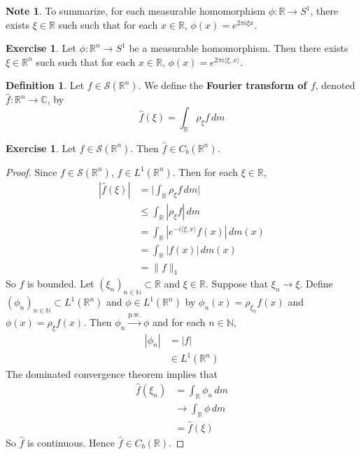 \documentclass{book}
\theoremstyle{definition}
\newtheorem{defn}[definition]{Definition}
\newtheorem{note}[definition]{Note}
\newtheorem{ex}[definition]{Exercise}
\newcommand{\C}{\mathbb{C}}
\newcommand{\N}{\mathbb{N}}
\newcommand{\R}{\mathbb{R}}
\newcommand{\MS}{\mathcal{S}}
\DeclareMathOperator*{\0}{\mbf{0}}
\DeclareMathOperator*{\1}{\mbf{1}}
\renewcommand{\r}{\rangle}
\renewcommand{\l}{\langle}
\newcommand{\convt}[1]{\xrightarrow{\text{#1}}}
\newcommand{\dm}{\, d m}
\begin{document}
	\begin{note}
		To summarize, for each measurable homomorphism $\phi:\R \rightarrow S^1$, there exists $\xi \in \R$ such  such that for each $x \in \R$, $\phi(x) = e^{2 \pi i  \xi x}$. 
	\end{note}

	\begin{ex}
		Let $\phi:\R^n \rightarrow S^1$ be a measurable homomorphism. Then there exists $\xi \in \R^n$ such such that for each $x \in \R$, $\phi(x) = e^{2 \pi i \l \xi,  x \r}$. 
	\end{ex}
	
	\begin{defn}
		Let $f \in \MS(\R^n)$. We define the \textbf{Fourier transform of $f$}, denoted $\hat{f} : \R^n \rightarrow \C$, by $$ \hat{f}(\xi) = \int_{\R} \rho_{\xi} f \, dm$$ 
	\end{defn}

	\begin{ex}
		Let $f \in \MS(\R^n)$. Then $\hat{f} \in C_b(\R^n)$.
	\end{ex}

	\begin{proof}
		Since $f \in \MS(\R^n)$, $f \in L^1(\R^n)$. Then for each $\xi \in \R$,
		\begin{align*}
			|\hat{f}(\xi)| 
			& = \bigg| \int_{\R} \rho_{\xi}f \dm \bigg| \\
			& \leq  \int_{\R} |\rho_{\xi} f| \dm \\
			& = \int_{\R} |e^{-i \l \xi,  x\r}f(x)| \dm(x) \\
			& = \int_{\R} |f(x)| \dm(x) \\
			& = \|f\|_1
		\end{align*}
		So $f$ is bounded. Let $(\xi_n)_{n \in \N} \subset \R$ and $\xi \in \R$. Suppose that $\xi_n \rightarrow \xi$. Define $(\phi_n)_{n \in \N} \subset L^1(\R^n)$ and $\phi \in L^1(\R^n)$ by $\phi_n(x) = \rho_{\xi_n}f(x)$ and $\phi(x) = \rho_{\xi}f(x)$. Then $\phi_n \convt{p.w.} \phi$ and for each $n \in \N$, 
		\begin{align*}
			|\phi_n|
			& = |f| \\
			& \in L^1(\R^n)
		\end{align*}
		The dominated convergence theorem implies that 
		\begin{align*}
			\hat{f}(\xi_n)
			& = \int_{\R} \phi_n \dm \\
			& \rightarrow \int_{\R} \phi \dm \\
			& = \hat{f}(\xi)
		\end{align*}
		So $\hat{f}$ is continuous. Hence $\hat{f} \in C_b(\R)$.
	\end{proof}
\end{document}
